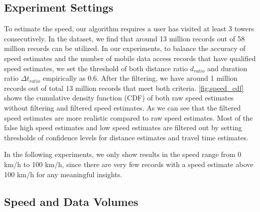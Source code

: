 \subsection{Experiment Settings}

To estimate the speed, our algorithm requires a user has visited at least 3 towers consecutively. In the dataset, we find that around 13 million records out of 58 million records can be utilized. In our experiments, to balance the accuracy of speed estimates and the number of mobile data access records that have qualified speed estimates, we set the threshold of both distance ratio $d_{ratio}$ and duration ratio $\Delta t_{ratio}$ empirically as 0.6. After the filtering, we have around 1 million records out of total 13 million records that meet both criteria. \autoref{fig:speed_cdf} shows the cumulative density function (CDF) of both raw speed estimates without filtering and filtered speed estimates. As we can see that the filtered speed estimates are more realistic compared to raw speed estimates. Most of the false high speed estimates and low speed estimates are filtered out by setting thresholds of confidence levels for distance estimates and travel time estimates.


In the following experiments, we only show results in the speed range from 0 km/h to 100 km/h, since there are very few records with a speed estimate above 100 km/h for any meaningful insights.

\subsection{Speed and Data Volumes}


